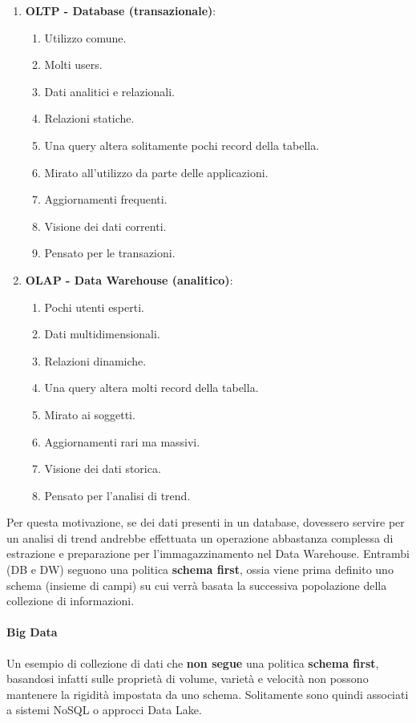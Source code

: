 \documentclass{article}
\begin{document}
\begin{enumerate}
    \item \textbf{OLTP - Database (transazionale)}:
    \begin{enumerate}
        \item Utilizzo comune.
        \item Molti users.
        \item Dati analitici e relazionali.
        \item Relazioni statiche.
        \item Una query altera solitamente pochi record della tabella.
        \item Mirato all'utilizzo da parte delle applicazioni.
        \item Aggiornamenti frequenti.
        \item Visione dei dati correnti.
        \item Pensato per le transazioni.
    \end{enumerate}
    \item \textbf{OLAP - Data Warehouse (analitico)}:
    \begin{enumerate}
        \item Pochi utenti esperti.
        \item Dati multidimensionali.
        \item Relazioni dinamiche.
        \item Una query altera molti record della tabella.
        \item Mirato ai soggetti.
        \item Aggiornamenti rari ma massivi.
        \item Visione dei dati storica.
        \item Pensato per l'analisi di trend.
    \end{enumerate}
\end{enumerate}

Per questa motivazione, se dei dati presenti in un database, dovessero servire per un analisi di trend andrebbe effettuata un operazione abbastanza complessa di
estrazione e preparazione per l'immagazzinamento nel Data Warehouse. Entrambi (DB e DW) seguono una politica \textbf{schema first}, ossia viene prima definito uno schema
(insieme di campi) su cui verrà basata la successiva popolazione della collezione di informazioni.

\paragraph{Big Data} Un esempio di collezione di dati che \textbf{non segue} una politica \textbf{schema first}, basandosi infatti sulle proprietà di volume, varietà e velocità
non possono mantenere la rigidità impostata da uno schema. Solitamente sono quindi associati a sistemi NoSQL o approcci Data Lake.
\end{document}
